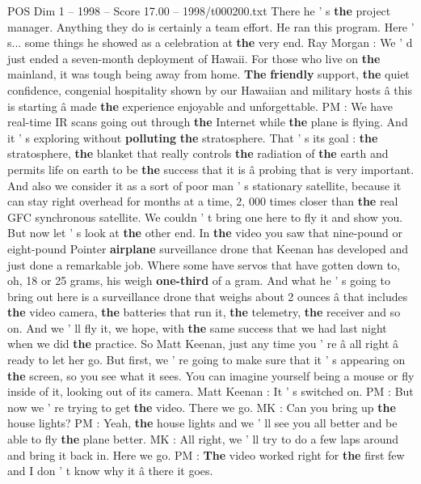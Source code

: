 \begin{textsample}{POS Dim 1 – 1998 – Score 17.00 – 1998/t000200.txt}
There he ' s \textbf{the} project manager.
Anything they do is certainly a team effort.
He ran this program.
Here ' s... some things he showed as a celebration at \textbf{the} very end.
Ray Morgan : We ' d just ended a seven-month deployment of Hawaii.
For those who live on \textbf{the} mainland, it was tough being away from home. \textbf{The} \textbf{friendly} support, \textbf{the} quiet confidence, congenial hospitality shown by our Hawaiian and military hosts â this is starting â made \textbf{the} experience enjoyable and unforgettable.
PM : We have real-time IR scans going out through \textbf{the} Internet while \textbf{the} plane is flying.
And it ' s exploring without \textbf{polluting} \textbf{the} stratosphere.
That ' s its goal : \textbf{the} stratosphere, \textbf{the} blanket that really controls \textbf{the} radiation of \textbf{the} earth and permits life on earth to be \textbf{the} success that it is â probing that is very important.
And also we consider it as a sort of poor man ' s stationary satellite, because it can stay right overhead for months at a time, 2, 000 times closer than \textbf{the} real GFC synchronous satellite.
We couldn ' t bring one here to fly it and show you.
But now let ' s look at \textbf{the} other end.
In \textbf{the} video you saw that nine-pound or eight-pound Pointer \textbf{airplane} surveillance drone that Keenan has developed and just done a remarkable job.
Where some have servos that have gotten down to, oh, 18 or 25 grams, his weigh \textbf{one-third} of a gram.
And what he ' s going to bring out here is a surveillance drone that weighs about 2 ounces â that includes \textbf{the} video camera, \textbf{the} batteries that run it, \textbf{the} telemetry, \textbf{the} receiver and so on.
And we ' ll fly it, we hope, with \textbf{the} same success that we had last night when we did \textbf{the} practice.
So Matt Keenan, just any time you ' re â all right â ready to let her go.
But first, we ' re going to make sure that it ' s appearing on \textbf{the} screen, so you see what it sees.
You can imagine yourself being a mouse or fly inside of it, looking out of its camera.
Matt Keenan : It ' s switched on.
PM : But now we ' re trying to get \textbf{the} video.
There we go.
MK : Can you bring up \textbf{the} house lights?
PM : Yeah, \textbf{the} house lights and we ' ll see you all better and be able to fly \textbf{the} plane better.
MK : All right, we ' ll try to do a few laps around and bring it back in.
Here we go.
PM : \textbf{The} video worked right for \textbf{the} first few and I don ' t know why it â there it goes.

\end{textsample}
